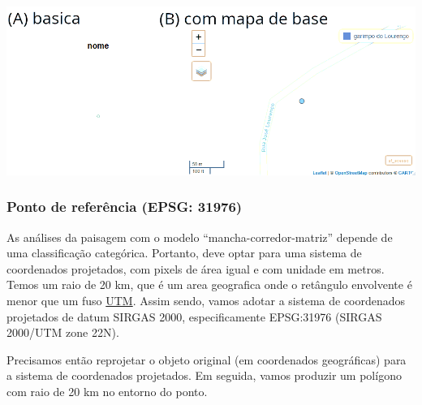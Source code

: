 \documentclass[
]{article}
\begin{document}
\includegraphics[width=0.8\linewidth,height=0.8\textheight]{figures/fig_garimpo_access}

\hypertarget{ponto-de-referuxeancia-epsg-31976}{%
\subsubsection{Ponto de referência (EPSG: 31976)}\label{ponto-de-referuxeancia-epsg-31976}}

As análises da paisagem com o modelo ``mancha-corredor-matriz'' depende
de uma classificação categórica. Portanto, deve
optar para uma sistema de coordenados projetados, com pixels de
área igual e com unidade em metros. Temos um raio de 20 km, que é um area geografica onde o retângulo envolvente é menor que um fuso \href{https://forest-gis.com/2016/06/um-pouco-sobre-a-projecao-utm.html/}{UTM}.
Assim sendo, vamos adotar a sistema de coordenados projetados de
datum SIRGAS 2000, especificamente EPSG:31976 (SIRGAS 2000/UTM zone 22N).

Precisamos então reprojetar o objeto original (em coordenados geográficas)
para a sistema de coordenados projetados. Em seguida, vamos produzir
um polígono com raio de 20 km no entorno do ponto.
\end{document}
